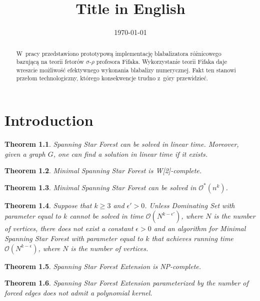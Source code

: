 \documentclass[en]{pracamgr}
\title{Title in English}
\date{\monthyeardate\today}
\newtheorem{theorem}{Theorem}
\newcommand{\ssfp}{{\sc Spanning Star Forest}}
\newcommand{\mssfp}{{\sc Minimal Spanning Star Forest}}
\newcommand{\ssfep}{{\sc Spanning Star Forest Extension}}
\newcommand{\domsetp}{{\sc Dominating Set}}
\begin{document}
\maketitle

\begin{abstract}
  W~pracy przedstawiono prototypową implementację blabalizatora
  różnicowego bazującą na teorii fetorów $\sigma$-$\rho$ profesora
  Fifaka.  Wykorzystanie teorii Fifaka daje wreszcie możliwość
  efektywnego wykonania blabalizy numerycznej.  Fakt ten stanowi
  przełom technologiczny, którego konsekwencje trudno z~góry
  przewidzieć.
\end{abstract}

\tableofcontents

\chapter{Introduction}

\begin{theorem}\label{thm-ssfp}
	\ssfp{} can be solved in linear time. Moreover, given a graph $G$, one can find a solution in linear time if it exists.
\end{theorem}

\begin{theorem}\label{thm-mssfp-w2c}
	\mssfp{} is \textup{W[2]}-complete.
\end{theorem}

\begin{theorem}\label{thm-mssfp-time}
	\mssfp{} can be solved in $\mathcal{O}^*(n^k)$.
\end{theorem}

\begin{theorem}\label{thm-mssfp-lowerbound}
	Suppose that $k \geq 3$ and $\epsilon' > 0$. Unless \domsetp{} with parameter equal to $k$ cannot be solved in time $\mathcal{O}(N^{k-\epsilon'})$, where $N$ is the number of vertices, there does not exist a constant $\epsilon >0$ and an algorithm for \mssfp{} with parameter equal to $k$ that achieves running time  $\mathcal{O}(N^{k-\epsilon})$, where $N$ is the number of vertices.
\end{theorem}

\begin{theorem}
	\ssfep{} is \textup{NP}-complete.
\end{theorem}

\begin{theorem}
	\ssfep{} parameterized by the number of forced edges does not admit a polynomial kernel.
\end{theorem}
\end{document}
